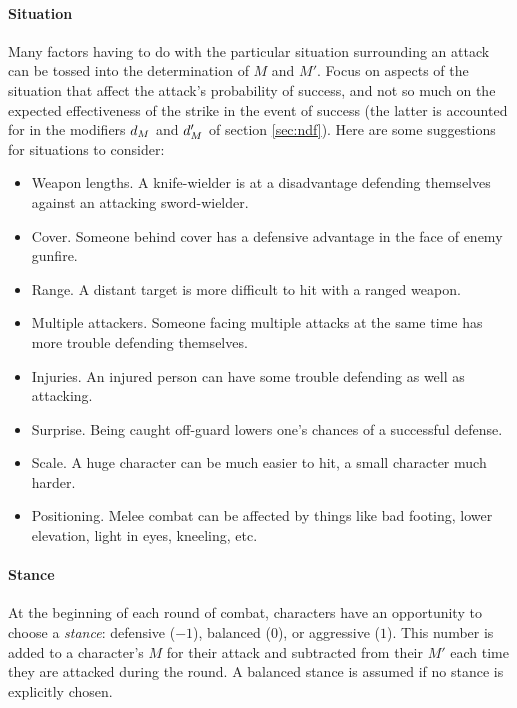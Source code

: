 \documentclass[12pt]{article}
\newcommand{\emdex}[1]{\emph{#1}\index{#1}}
\begin{document}
\paragraph{Situation}
Many factors having to do with the particular situation
surrounding an attack can be tossed into the determination of $M$ and $M'$.
Focus on
aspects of the situation that affect the attack's probability of success,
and not so much on the expected effectiveness of the strike in the
event of success (the latter is accounted for in the modifiers $d_M$ and $d_M'$
of section \ref{sec:ndf}).
Here are some suggestions for situations to consider:
\vspace{-1em}\begin{itemize}
\item Weapon lengths. A knife-wielder is at a disadvantage defending themselves against an attacking sword-wielder.
\item Cover. Someone behind cover has a defensive advantage in the face of enemy gunfire.
\item Range. A distant target is more difficult to hit with a ranged weapon.
\item Multiple attackers. Someone facing multiple attacks at the same time has more trouble defending themselves.
\item Injuries. An injured person can have some trouble defending as well as attacking.
\item Surprise. Being caught off-guard lowers one's chances of a successful defense.
\item Scale. A huge character can be much easier to hit, a small character much harder.
\item Positioning. Melee combat can be affected by things like bad footing,
lower elevation, light in eyes, kneeling, etc. %
\end{itemize}




\paragraph{Stance}
At the beginning of each round of combat,
characters have an opportunity to choose a \emdex{stance}:
defensive ($-1$), balanced ($0$), or aggressive ($1$).
This number is added to a character's $M$ for their attack and subtracted from their
$M'$ each time they are attacked during the round.
A balanced stance is assumed if no stance is explicitly chosen.
\end{document}
